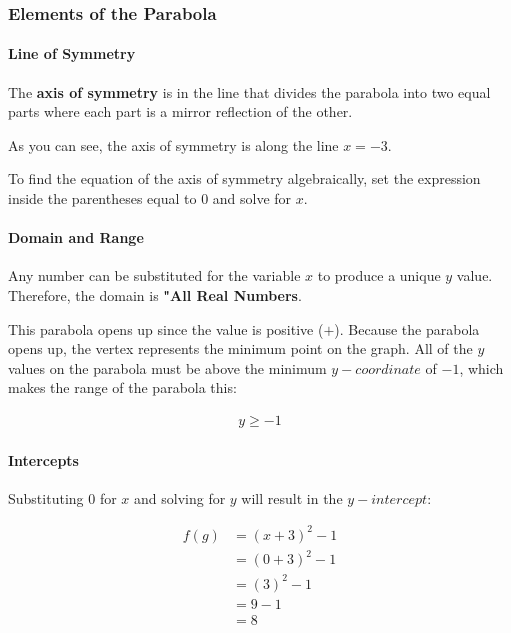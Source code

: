 \newpage

\subsubsection*{Elements of the Parabola}

\begin{marginfigure}
    \centering
    \label{fig:parabola}
\end{marginfigure}

\paragraph{Line of Symmetry} The \textbf{axis of symmetry} is in the line
that divides the parabola into two equal parts where each part is a
mirror reflection of the other.

As you can see, the axis of symmetry is along the line $x = -3$.

To find the equation of the axis of symmetry algebraically, set the expression inside the parentheses equal to $0$ and solve for $x$.

\paragraph{Domain and Range} Any number can be substituted for the variable $x$
to produce a unique $y$ value. Therefore, the domain is \textbf{"All Real Numbers}.

This parabola opens up since the value is positive ($+$). Because the parabola opens up, the vertex represents the minimum point on the graph.
All of the $y$ values on the parabola must be above the minimum $y-coordinate$ of $-1$, which makes the range of the parabola this:

\begin{align}
    y \geq -1
\end{align}

\paragraph{Intercepts} Substituting $0$ for $x$ and solving for $y$ will result in the $y-intercept$:

\begin{align}
    f(g) &= (x + 3)^2 - 1 \\
         &= (0 + 3)^2 - 1 \\
         &= (3)^2 - 1 \\
         &= 9 - 1 \\
         &= 8
\end{align}

